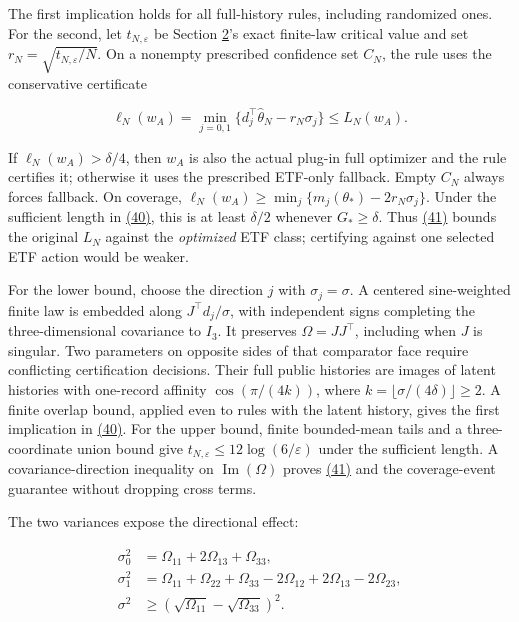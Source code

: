 \documentclass[11pt]{article}
\begin{document}
The first implication holds for all full-history rules,
including randomized ones. For the second, let
\(t_{N,\varepsilon}\) be Section \hyperref[sec:2]{2}'s exact finite-law
critical value and set
\(r_N=\sqrt{t_{N,\varepsilon}/N}\). On a nonempty
prescribed confidence set \(C_N\), the rule uses the
conservative certificate

\begin{equation*}
\ell_N(w_A)=\min_{j=0,1}
 \{d_j^\top\widehat\theta_N-r_N\sigma_j\}
 \leq L_N(w_A).
\tag{41}\label{eq:41}
\end{equation*}

If \(\ell_N(w_A)>\delta/4\), then \(w_A\) is also the
actual plug-in full optimizer and the rule certifies it;
otherwise it uses the prescribed ETF-only fallback. Empty
\(C_N\) always forces fallback. On coverage,
\(\ell_N(w_A)\geq\min_j\{m_j(\theta_*)-2r_N\sigma_j\}\).
Under the sufficient length in \hyperref[eq:40]{(40)}, this is at least
\(\delta/2\) whenever \(G_*\geq\delta\). Thus \hyperref[eq:41]{(41)} bounds
the original \(L_N\) against the \emph{optimized} ETF class;
certifying against one selected ETF action would be weaker.

For the lower bound, choose the direction \(j\) with
\(\sigma_j=\sigma\). A centered sine-weighted finite law
is embedded along \(J^\top d_j/\sigma\), with independent
signs completing the three-dimensional covariance to
\(I_3\). It preserves \(\Omega=JJ^\top\), including when
\(J\) is singular. Two parameters on opposite sides of
that comparator face require conflicting certification
decisions. Their full public histories are images of latent
histories with one-record affinity
\(\cos(\pi/(4k))\), where
\(k=\lfloor\sigma/(4\delta)\rfloor\geq2\). A finite
overlap bound, applied even to rules with the latent history,
gives the first implication in \hyperref[eq:40]{(40)}. For the upper bound,
finite bounded-mean tails and a three-coordinate union bound
give \(t_{N,\varepsilon}\leq12\log(6/\varepsilon)\)
under the sufficient length. A covariance-direction
inequality on \(\operatorname{Im}(\Omega)\) proves \hyperref[eq:41]{(41)} and
the coverage-event guarantee without dropping cross terms.

The two variances expose the directional effect:

\begin{equation*}
\begin{aligned}
\sigma_0^2&=\Omega_{11}+2\Omega_{13}+\Omega_{33},\\
\sigma_1^2&=\Omega_{11}+\Omega_{22}+\Omega_{33}
 -2\Omega_{12}+2\Omega_{13}-2\Omega_{23},\\
\sigma^2&\geq
 (\sqrt{\Omega_{11}}-\sqrt{\Omega_{33}})^2.
\end{aligned}\tag{42}\label{eq:42}
\end{equation*}
\end{document}
